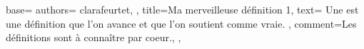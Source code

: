 {
  base={
    authors={
      clarafeurtet,
    },
    title=Ma merveilleuse définition 1,
    text={
      Une  est une définition que l'on avance et que l'on soutient comme vraie.
    },
    comment={Les définitions sont à connaître par coeur.},
  },
}
